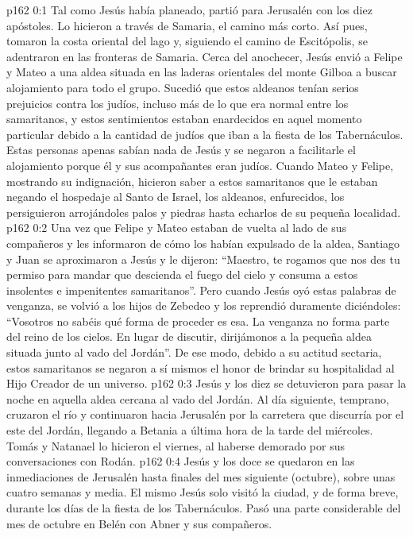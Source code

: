 \author{Comisión de seres intermedios}
\vs p162 0:1 Tal como Jesús había planeado, partió para Jerusalén con los diez apóstoles. Lo hicieron a través de Samaria, el camino más corto. Así pues, tomaron la costa oriental del lago y, siguiendo el camino de Escitópolis, se adentraron en las fronteras de Samaria. Cerca del anochecer, Jesús envió a Felipe y Mateo a una aldea situada en las laderas orientales del monte Gilboa a buscar alojamiento para todo el grupo. Sucedió que estos aldeanos tenían serios prejuicios contra los judíos, incluso más de lo que era normal entre los samaritanos, y estos sentimientos estaban enardecidos en aquel momento particular debido a la cantidad de judíos que iban a la fiesta de los Tabernáculos. Estas personas apenas sabían nada de Jesús y se negaron a facilitarle el alojamiento porque él y sus acompañantes eran judíos. Cuando Mateo y Felipe, mostrando su indignación, hicieron saber a estos samaritanos que le estaban negando el hospedaje al Santo de Israel, los aldeanos, enfurecidos, los persiguieron arrojándoles palos y piedras hasta echarlos de su pequeña localidad.
\vs p162 0:2 Una vez que Felipe y Mateo estaban de vuelta al lado de sus compañeros y les informaron de cómo los habían expulsado de la aldea, Santiago y Juan se aproximaron a Jesús y le dijeron: “Maestro, te rogamos que nos des tu permiso para mandar que descienda el fuego del cielo y consuma a estos insolentes e impenitentes samaritanos”. Pero cuando Jesús oyó estas palabras de venganza, se volvió a los hijos de Zebedeo y los reprendió duramente diciéndoles: “Vosotros no sabéis qué forma de proceder es esa. La venganza no forma parte del reino de los cielos. En lugar de discutir, dirijámonos a la pequeña aldea situada junto al vado del Jordán”. De ese modo, debido a su actitud sectaria, estos samaritanos se negaron a sí mismos el honor de brindar su hospitalidad al Hijo Creador de un universo.
\vs p162 0:3 Jesús y los diez se detuvieron para pasar la noche en aquella aldea cercana al vado del Jordán. Al día siguiente, temprano, cruzaron el río y continuaron hacia Jerusalén por la carretera que discurría por el este del Jordán, llegando a Betania a última hora de la tarde del miércoles. Tomás y Natanael lo hicieron el viernes, al haberse demorado por sus conversaciones con Rodán.
\vs p162 0:4 \pc Jesús y los doce se quedaron en las inmediaciones de Jerusalén hasta finales del mes siguiente (octubre), sobre unas cuatro semanas y media. El mismo Jesús solo visitó la ciudad, y de forma breve, durante los días de la fiesta de los Tabernáculos. Pasó una parte considerable del mes de octubre en Belén con Abner y sus compañeros.
